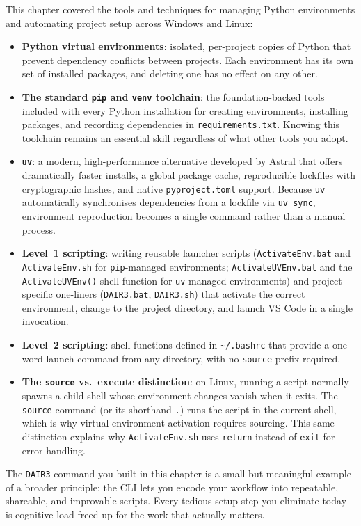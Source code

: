 This chapter covered the tools and techniques for managing Python
environments and automating project setup across Windows and Linux:

\begin{itemize}
  \item \textbf{Python virtual environments}: isolated, per-project
        copies of Python that prevent dependency conflicts between
        projects. Each environment has its own set of installed packages,
        and deleting one has no effect on any other.
  \item \textbf{The standard \texttt{pip} and \texttt{venv} toolchain}:
        the foundation-backed tools included with every Python
        installation for creating environments, installing packages, and
        recording dependencies in \texttt{requirements.txt}. Knowing
        this toolchain remains an essential skill regardless of what
        other tools you adopt.
  \item \textbf{\texttt{uv}}: a modern, high-performance alternative
        developed by Astral that offers dramatically faster installs, a
        global package cache, reproducible lockfiles with cryptographic
        hashes, and native \texttt{pyproject.toml} support. Because
        \texttt{uv} automatically synchronises dependencies from a
        lockfile via \texttt{uv sync}, environment reproduction becomes
        a single command rather than a manual process.
  \item \textbf{Level~1 scripting}: writing reusable launcher scripts
        (\texttt{ActivateEnv.bat} and \texttt{ActivateEnv.sh} for
        \texttt{pip}-managed environments; \texttt{ActivateUVEnv.bat}
        and the \texttt{ActivateUVEnv()} shell function for
        \texttt{uv}-managed environments) and project-specific
        one-liners (\texttt{DAIR3.bat}, \texttt{DAIR3.sh}) that
        activate the correct environment, change to the project
        directory, and launch VS Code in a single invocation.
  \item \textbf{Level~2 scripting}: shell functions defined in
        \texttt{\textasciitilde/.bashrc} that provide a one-word launch
        command from any directory, with no \texttt{source} prefix
        required.
  \item \textbf{The \texttt{source} vs.\ execute distinction}: on
        Linux, running a script normally spawns a child shell whose
        environment changes vanish when it exits. The \texttt{source}
        command (or its shorthand \texttt{.}) runs the script in the
        current shell, which is why virtual environment activation
        requires sourcing. This same distinction explains why
        \texttt{ActivateEnv.sh} uses \texttt{return} instead of
        \texttt{exit} for error handling.
\end{itemize}

The \texttt{DAIR3} command you built in this chapter is a small but
meaningful example of a broader principle: the CLI lets you encode your
workflow into repeatable, shareable, and improvable scripts. Every
tedious setup step you eliminate today is cognitive load freed up for the
work that actually matters.
